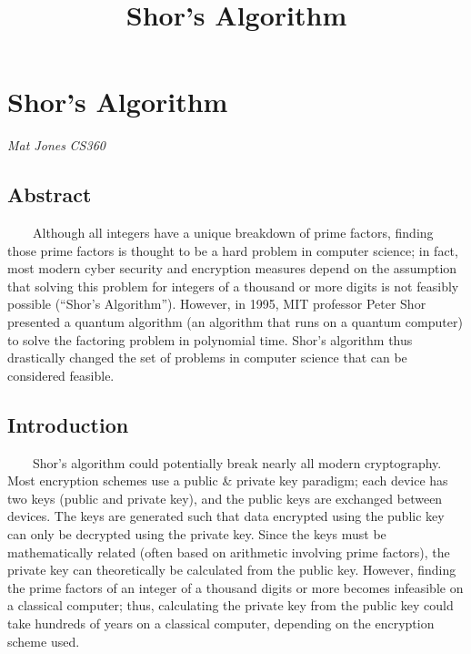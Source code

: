 \documentclass[11pt]{article}
\title{Shor's Algorithm}
\begin{document}
    
    
    \maketitle
    
    

    
    \hypertarget{shors-algorithm}{%
\section{Shor's Algorithm}\label{shors-algorithm}}

\emph{Mat Jones} \emph{CS360}

    \hypertarget{abstract}{%
\subsection{Abstract}\label{abstract}}

~~~~Although all integers have a unique breakdown of prime factors,
finding those prime factors is thought to be a hard problem in computer
science; in fact, most modern cyber security and encryption measures
depend on the assumption that solving this problem for integers of a
thousand or more digits is not feasibly possible (``Shor's Algorithm'').
However, in 1995, MIT professor Peter Shor presented a quantum algorithm
(an algorithm that runs on a quantum computer) to solve the factoring
problem in polynomial time. Shor's algorithm thus drastically changed
the set of problems in computer science that can be considered feasible.

    \hypertarget{introduction}{%
\subsection{Introduction}\label{introduction}}

~~~~Shor's algorithm could potentially break nearly all modern
cryptography. Most encryption schemes use a public \& private key
paradigm; each device has two keys (public and private key), and the
public keys are exchanged between devices. The keys are generated such
that data encrypted using the public key can only be decrypted using the
private key. Since the keys must be mathematically related (often based
on arithmetic involving prime factors), the private key can
theoretically be calculated from the public key. However, finding the
prime factors of an integer of a thousand digits or more becomes
infeasible on a classical computer; thus, calculating the private key
from the public key could take hundreds of years on a classical
computer, depending on the encryption scheme used.
\end{document}
